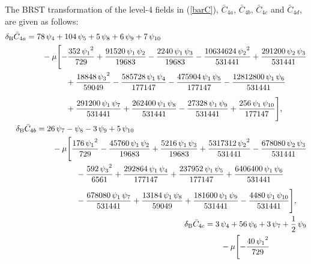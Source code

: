 \documentclass[a4paper,12pt]{article}
\begin{document}
The BRST transformation of the level-4 fields in (\ref{barC}),
$\bar C_{4a}$, $\bar C_{4b}$, $\bar C_{4c}$ and $\bar C_{4d}$,
are given as follows:
\begin{align}
  \begin{split}
    \label{dBC4a}
    \delB \bar C_{4a} &=
  78\,\psi_4 + 104\,\psi_5 +
   5\,\psi_8 + 6\,\psi_9 + 7\,\psi_{10}\\
     & \qquad- \kp\Biggl[
      -\frac{352\,{\psi_1}^2}{729}
      +\frac{91520\,\psi_1\,\psi_2}{19683}
      -\frac{2240\,\psi_1\,\psi_3}{19683}
      -\frac{10634624\,{\psi_2}^2}{531441}
      +\frac{291200\,\psi_2\,\psi_3}{531441}\\
     & \hspace*{5em} +\frac{18848\,{\psi_3}^2}{59049}
      -\frac{585728\,\psi_1\,\psi_4}{177147}
      -\frac{475904\,\psi_1\,\psi_5}{177147}
      -\frac{12812800\,\psi_1\,\psi_6}{531441}\\[5pt]
     & \hspace*{5em} +\frac{291200\,\psi_1\,\psi_7}{531441}
     +\frac{262400\,\psi_1\,\psi_8}{531441}
      -\frac{27328\,\psi_1\,\psi_9}{531441}
      +\frac{256\,\psi_1\,\psi_{10}}{177147}
 \Biggr],
\end{split}
\\
%
\begin{split}
  \label{dBC4b}
  \delB \bar C_{4b} &=
   26\,\psi_7 - \psi_8 - 3\,\psi_9 + 5\,\psi_{10}\\
     & \qquad - \kp\Biggl[
      \frac{176\,{\psi_1}^2}{729}
     -\frac{45760\,\psi_1\,\psi_2}{19683}
     +\frac{5216\,\psi_1\,\psi_3}{19683}
     +\frac{5317312\,{\psi_2}^2}{531441}
     -\frac{678080\,\psi_2\,\psi_3}{531441}\\
     & \hspace*{5em}-\frac{592\,{\psi_3}^2}{6561}
     +\frac{292864\,\psi_1\,\psi_4}{177147}
     +\frac{237952\,\psi_1\,\psi_5}{177147}
     +\frac{6406400\,\psi_1\,\psi_6}{531441}\\[5pt]
     & \hspace*{5em}-\frac{678080\,\psi_1\,\psi_7}{531441}
     +\frac{13184\,\psi_1\,\psi_8}{59049}
     +\frac{181600\,\psi_1\,\psi_9}{531441}
     -\frac{4480\,\psi_1\,\psi_{10}}{531441}
\Biggr],
\end{split}
\\
%
\begin{split}
  \label{dBC4c}
  \delB \bar C_{4c} &=
  3\,\psi_4 + 56\,\psi_6 + 3\,\psi_7 + \frac{1}{2}\,\psi_9\\
    & \qquad- \kp\Biggl[
     - \frac{40\,{\psi_1}^2}{729}

\end{split}
\end{align}
\end{document}
